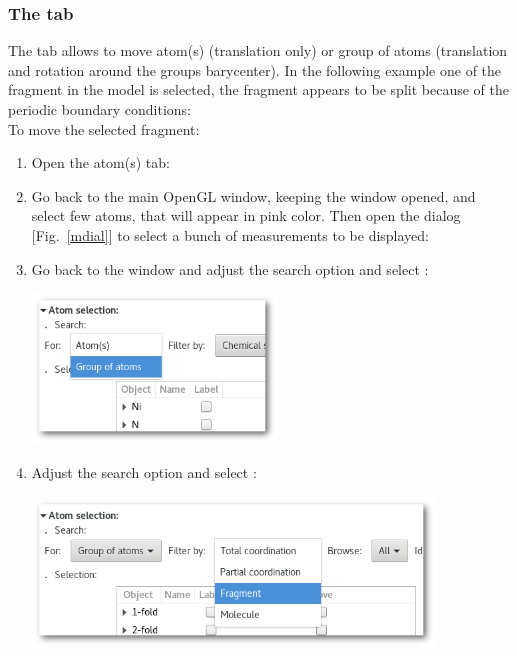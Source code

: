 \subsubsection*{The  tab}
\label{movetab}
The  tab allows to move atom(s) (translation only) or group of atoms (translation and rotation around the groups barycenter).  
In the following example one of the fragment in the model is selected, the fragment appears to be split because of the periodic boundary conditions: \\
\laf To move the selected fragment:
\begin{enumerate}
\item Open the  atom(s) tab: 
\begin{center}  \end{center}
\newpage
\item Go back to the main OpenGL window, keeping the  window opened, and select few atoms, that will appear in pink color. 
Then open the  dialog [Fig.~\ref{mdial}] to select a bunch of measurements to be displayed: 
\begin{center}\end{center}
\item Go back to the  window and adjust the search  option and select : 
\begin{center}\includegraphics*[height=4cm, keepaspectratio=true, draft=\ddst]{img/edit/atoms/move/sel-group}\end{center}
\item Adjust the search  option and select : 
\begin{center}\includegraphics*[height=4cm, keepaspectratio=true, draft=\ddst]{img/edit/atoms/move/sel-frag}\end{center}

\end{enumerate}

